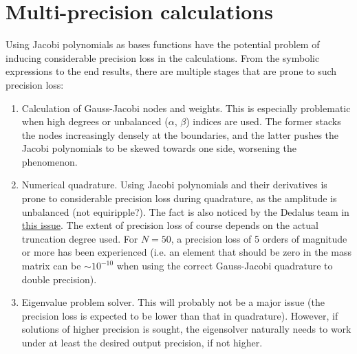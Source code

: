 \section{Multi-precision calculations}

Using Jacobi polynomials as bases functions have the potential problem of inducing considerable precision loss in the calculations.
From the symbolic expressions to the end results, there are multiple stages that are prone to such precision loss:
\begin{enumerate}
    \item Calculation of Gauss-Jacobi nodes and weights. This is especially problematic when high degrees or unbalanced ($\alpha$, $\beta$) indices are used. The former stacks the nodes increasingly densely at the boundaries, and the latter pushes the Jacobi polynomials to be skewed towards one side, worsening the phenomenon.
    \item Numerical quadrature. Using Jacobi polynomials and their derivatives is prone to considerable precision loss during quadrature, as the amplitude is unbalanced (not equiripple?). The fact is also noticed by the Dedalus team in \href{https://github.com/DedalusProject/dedalus/issues/166}{this issue}. The extent of precision loss of course depends on the actual truncation degree used. For $N=50$, a precision loss of 5 orders of magnitude or more has been experienced (i.e. an element that should be zero in the mass matrix can be $\sim 10^{-10}$ when using the correct Gauss-Jacobi quadrature to double precision).
    \item Eigenvalue problem solver. This will probably not be a major issue (the precision loss is expected to be lower than that in quadrature). However, if solutions of higher precision is sought, the eigensolver naturally needs to work under at least the desired output precision, if not higher.
\end{enumerate}

